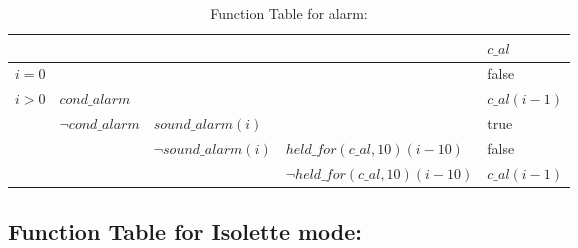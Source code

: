 \documentclass[fontsize=12pt,paper=letter,twoside]{scrartcl}
\begin{document}
\begin{table}[htb!]
\centering
\label{my-label}
\begin{tabular}{llll|l|}
\cline{5-5}
                                                        &                                                       &                                                           &                                & $c\_al$                 \\ \hline
\multicolumn{4}{|l|}{$i = 0$}                                                                                                                                                                                  & false          \\ \hline
\multicolumn{1}{|l|}{\multirow{4}{*}{$i > 0$}} & \multicolumn{3}{l|}{$cond\_alarm$}                                                                                                                   & $c\_al(i-1)$ \\ \cline{2-5}
\multicolumn{1}{|l|}{}                                  & \multicolumn{1}{l|}{\multirow{3}{*}{$\neg cond\_alarm$}} & \multicolumn{2}{l|}{$sound\_alarm(i)$}                                                       & true              \\ \cline{3-5}
\multicolumn{1}{|l|}{}                                  & \multicolumn{1}{l|}{}                                 & \multicolumn{1}{l|}{\multirow{2}{*}{$\neg sound\_alarm(i)$}} & $held\_for(c\_al, 10)(i-10)$     & false          \\ \cline{4-5}
\multicolumn{1}{|l|}{}                                  & \multicolumn{1}{l|}{}                                 & \multicolumn{1}{l|}{}                                     & $\neg held\_for(c\_al, 10)(i-10)$ & $c\_al(i-1)$ \\ \hline
\end{tabular}
\caption{Function Table for alarm: }
\end{table}

\FloatBarrier
\subsection{Function Table for Isolette mode: }
\FloatBarrier
\end{document}
